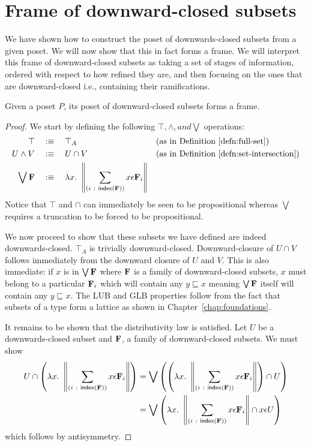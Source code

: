 \section{Frame of downward-closed subsets}\label{sec:down-set-frame}

We have shown how to construct the poset of downwards-closed subsets from a given poset.
We will now show that this in fact forms a frame. We will interpret this frame of
downward-closed subsets as taking a set of stages of information, ordered with respect to
how refined they are, and then focusing on the ones that are downward-closed i.e.,
containing their ramifications.

\begin{thm}
  Given a poset $P$, its poset of downward-closed subsets forms a frame.
\end{thm}
\begin{proof}
  We start by defining the following $\top, \wedge, and \bigvee$ operations:
  \begin{align*}
    \top       \quad&:\equiv\quad \top_A   && \text{(as in Definition~\ref{defn:full-set})}               \\
    U \wedge V   \quad&:\equiv\quad U \cap V && \text{(as in Definition~\ref{defn:set-intersection})}       \\
    \bigvee \mathbf{F}{} \quad&:\equiv\quad \lambda x.~ \left\| \sum_{(i~:~\mathsf{index}{}\left(\mathbf{F}{}\right))} x \epsilon \mathbf{F}{}_i \right\|
  \end{align*}
  Notice that $\top$ and $\cap$ can immediately be seen to be propositional whereas $\bigvee$ requires
  a truncation to be forced to be propositional.

  We now proceed to show that these subsets we have defined are indeed downwards-closed.
  $\top_A$ is trivially downward-closed. Downward-closure of $U \cap V$ follows immediately from
  the downward closure of $U$ and $V$. This is also immediate: if $x$ is in $\bigvee \mathbf{F}{}$
  where $\mathbf{F}{}$ is a family of downward-closed subsets, $x$ must belong to a particular
  $\mathbf{F}{}_i$ which will contain any $y \sqsubseteq x$ meaning $\bigvee \mathbf{F}{}$ itself will contain any $y \sqsubseteq
  x$. The LUB and GLB properties follow from the fact that subsets of a type form a
  lattice as shown in Chapter~\ref{chap:foundations}.

  It remains to be shown that the distributivity law is satisfied. Let $U$ be a
  downwards-closed subset and $\mathbf{F}{}$, a family of downward-closed subsets. We must show
  \begin{align*}
    U \cap \left(\lambda x.~ \left\| \sum_{(i~:~\mathsf{index}{}\left(\mathbf{F}{}\right))} x \epsilon \mathbf{F}{}_i \right\|\right) &=
      \bigvee \left( \left( \lambda x.~ \left\| \sum_{(i~:~\mathsf{index}{}\left(\mathbf{F}{}\right))} x \epsilon \mathbf{F}{}_i \right\|\right) \cap U \right)\\
      &= \bigvee \left( \lambda x.~ \left\| \sum_{(i~:~\mathsf{index}{}\left(\mathbf{F}{}\right))} x \epsilon \mathbf{F}{}_i \right\| \cap x \epsilon U \right)
  \end{align*}
  which follows by antisymmetry.
\end{proof}

